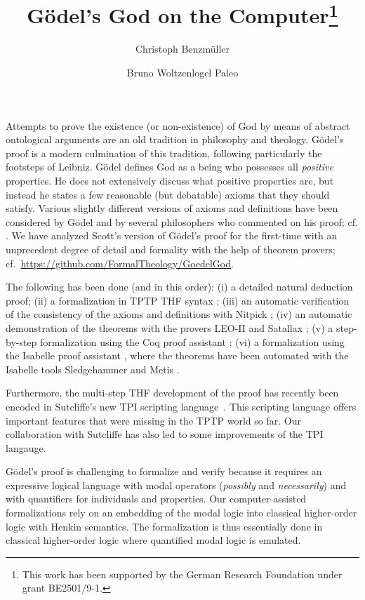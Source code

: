\documentclass{easychair}
\title{G\"{o}del's God on the Computer\thanks{This work has been
    supported by the German Research Foundation under grant
    BE2501/9-1.}}
\author{
  Christoph Benzm\"{u}ller\inst{1} 
  \and 
  Bruno Woltzenlogel Paleo\inst{2}
}
\institute{
 Freie Universit\"{a}t Berlin, Germany \\
 \email{c.benzmueller@fu-berlin.de} \\
  \and 
 Vienna University of Technology, Austria \\
  \email{bruno@logic.at} \\
}
\begin{document}
\maketitle

Attempts to prove the existence (or non-existence) of God by means of
abstract ontological arguments are an old tradition in philosophy and
theology.  G\"{o}del's proof \cite{Goedel1970,GoedelNotes} is a modern culmination of
this tradition, following particularly the footsteps of Leibniz.
%
G\"{o}del defines God as a being who possesses all \emph{positive} properties.
He does not extensively discuss what positive properties are, 
but instead he states a few reasonable (but debatable) axioms that they should satisfy.
Various slightly different versions of axioms and definitions have
been considered by G\"{o}del and by several philosophers who commented
on his proof; cf. \cite{sobel2004logic,AndersonGettings,Fitting,Adams,ContemporaryBibliography}.
We have analyzed Scott's version of G\"{o}del's proof \cite{ScottNotes} for the first-time
with an unprecedent degree of detail 
and formality with the help of theorem provers; cf.~\url{https://github.com/FormalTheology/GoedelGod}.

The following has been done (and in this order):
(i) a detailed natural deduction proof;
%
(ii) a formalization in TPTP THF syntax \cite{THF};
%
(iii) an automatic verification of the consistency of the axioms and 
definitions with Nitpick \cite{Nitpick};
%
(iv) an automatic demonstration of the theorems with the provers LEO-II \cite{LEO} and Satallax \cite{Satallax};
%
(v) a step-by-step formalization using the Coq proof assistant \cite{Coq};
%
(vi) a formalization using the Isabelle proof assistant \cite{Isabelle}, where the
theorems have been automated with the Isabelle tools Sledgehammer \cite{Sledgehammer} and Metis \cite{Metis}.

Furthermore, the multi-step THF development of the proof has
recently been encoded in Sutcliffe's new TPI scripting
language~\cite{}. This scripting language offers important features
that were missing in the TPTP world so far. Our collaboration with
Sutcliffe has also led to some improvements of the TPI langauge.

G\"{o}del's proof is challenging to formalize and verify because it
requires an expressive logical language with modal operators
(\emph{possibly} and \emph{necessarily}) and with
quantifiers for individuals and properties.  Our computer-assisted formalizations rely on an
embedding of the modal logic into classical higher-order logic with
Henkin semantics. The formalization is thus essentially
done in classical higher-order logic where  quantified modal logic is
emulated.
\end{document}
